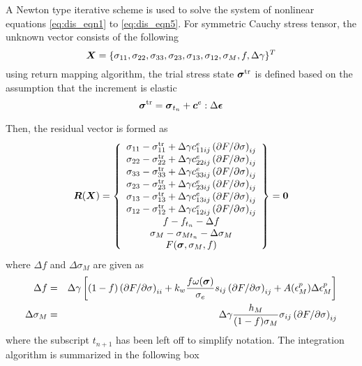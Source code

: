 A Newton type iterative scheme is used to solve the system of nonlinear equations \eqref{eq:dis_eqn1} to \eqref{eq:dis_eqn5}. For symmetric Cauchy stress tensor, the unknown vector consists of the following 
\begin{equation}\label{eq:X}
{\boldsymbol{X}} = \{ \sigma_{11}, \sigma_{22},\sigma_{33},\sigma_{23},\sigma_{13},\sigma_{12}, \sigma_M, f, \Delta\gamma \}^T
\end{equation}
using return mapping algorithm, the trial stress state ${\boldsymbol{\sigma}}^{\operatorname{\text{tr}}}$ is defined based on the assumption that the increment is elastic
\begin{equation}
{\boldsymbol{\sigma}}^{\operatorname{\text{tr}}} = {\boldsymbol{\sigma}}_{t_n} + {\boldsymbol{c}}^e:\Delta{\boldsymbol{\epsilon}}
\end{equation}

Then, the residual vector is formed as
\begin{equation}\label{eq:R}
{\boldsymbol{R}}({\boldsymbol{X}}) = 
	\left\lbrace 
	\begin{array}{c}
	 	\sigma_{11} - \sigma_{11}^{\operatorname{\text{tr}}} + \Delta\gamma c^e_{11ij}\left( \partial F/ \partial\sigma\right)_{ij} \\
		\sigma_{22} - \sigma_{22}^{\operatorname{\text{tr}}} + \Delta\gamma c^e_{22ij}\left( \partial F/ \partial\sigma\right)_{ij} \\
		\sigma_{33} - \sigma_{33}^{\operatorname{\text{tr}}} + \Delta\gamma c^e_{33ij}\left( \partial F/ \partial\sigma\right)_{ij} \\
		\sigma_{23} - \sigma_{23}^{\operatorname{\text{tr}}} + \Delta\gamma c^e_{23ij}\left( \partial F/ \partial\sigma\right)_{ij} \\
		\sigma_{13} - \sigma_{13}^{\operatorname{\text{tr}}} + \Delta\gamma c^e_{13ij}\left( \partial F/ \partial\sigma\right)_{ij} \\
		\sigma_{12} - \sigma_{12}^{\operatorname{\text{tr}}} + \Delta\gamma c^e_{12ij}\left( \partial F/ \partial\sigma\right)_{ij} \\		
		f - f_{t_n} - \Delta f\\
		\sigma_M - \sigma_{Mt_n} -  \Delta\sigma_M\\
		F({\boldsymbol{\sigma}}, \sigma_M, f)	
	\end{array}	
	\right\rbrace 
	= {\boldsymbol{0}}
\end{equation}
where $\Delta f$ and $\Delta\sigma_M$ are given as
\begin{eqnarray}
\Delta f &=& \Delta\gamma \left[ (1-f) \left( \partial F/ \partial\sigma\right)_{ii} + k_w\frac{f \omega({\boldsymbol{\sigma}})}{\sigma_e}s_{ij} \left( \partial F/ \partial\sigma\right)_{ij} +A(\epsilon_{M}^p)\Delta\epsilon_M^p \right] \\
\Delta\sigma_M &=& \Delta\gamma\frac{h_M}{(1-f)\sigma_M}\sigma_{ij}\left( \partial F/ \partial\sigma\right)_{ij}
\end{eqnarray}
where the subscript $t_{n+1}$ has been left off to simplify notation. 
The integration algorithm is summarized in the following box\\

